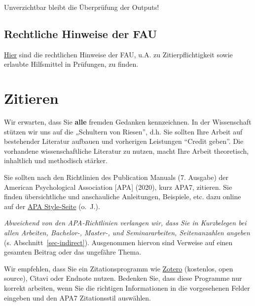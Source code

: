 \documentclass[
  letterpaper,
  DIV=11]{scrreprt}
\begin{document}
Unverzichtbar bleibt die Überprüfung der Outputs!

\section{Rechtliche Hinweise der FAU}\label{rechtliche-hinweise-der-fau}

\href{https://digitale-lehre.fau.de/digital-lehren/umsetzen/kuenstliche-intelligenz-in-der-lehre/}{Hier}
sind die rechtlichen Hinweise der FAU, u.A. zu Zitierpflichtigkeit sowie
erlaubte Hilfsmittel in Prüfungen, zu finden.

\chapter{Zitieren}\label{zitieren}

Wir erwarten, dass Sie \textbf{alle} fremden Gedanken kennzeichnen. In
der Wissenschaft stützen wir uns auf die „Schultern von Riesen'', d.h.
Sie sollten Ihre Arbeit auf bestehender Literatur aufbauen und
vorherigen Leistungen ``Credit geben''. Die vorhandene wissenschaftliche
Literatur zu nutzen, macht Ihre Arbeit theoretisch, inhaltlich und
methodisch stärker.

Sie sollten nach den Richtlinien des Publication Manuals (7. Ausgabe)
der American Psychological Association {[}APA{]} (2020), kurz APA7,
zitieren. Sie finden übersichtliche und anschauliche Anleitungen,
Beispiele, etc. dazu online auf der \href{https://apastyle.apa.org/}{APA
Style-Seite} (o.~J.).

\begin{tcolorbox}[enhanced jigsaw, left=2mm, rightrule=.15mm, bottomrule=.15mm, bottomtitle=1mm, colback=white, leftrule=.75mm, breakable, titlerule=0mm, toptitle=1mm, opacityback=0, opacitybacktitle=0.6, colbacktitle=quarto-callout-important-color!10!white, colframe=quarto-callout-important-color-frame, arc=.35mm, toprule=.15mm, coltitle=black, title=\textcolor{quarto-callout-important-color}{\faExclamation}\hspace{0.5em}{Wichtig}]

\emph{Abweichend von den APA-Richtlinien verlangen wir, dass Sie in
Kurzbelegen bei allen Arbeiten, Bachelor-, Master-, und Seminararbeiten,
Seitenanzahlen angeben} (s. Abschnitt~\ref{sec-indirect}). Ausgenommen
hiervon sind Verweise auf einen gesamten Beitrag oder das ungefähre
Thema.

\end{tcolorbox}

Wir empfehlen, dass Sie ein Zitationsprogramm wie
\href{https://www.zotero.org/}{Zotero} (kostenlos, open source), Citavi
oder Endnote nutzen. Bedenken Sie, dass diese Programme nur korrekt
arbeiten, wenn Sie die richtigen Informationen in die vorgesehenen
Felder eingeben und den APA7 Zitationsstil auswählen.
\end{document}
